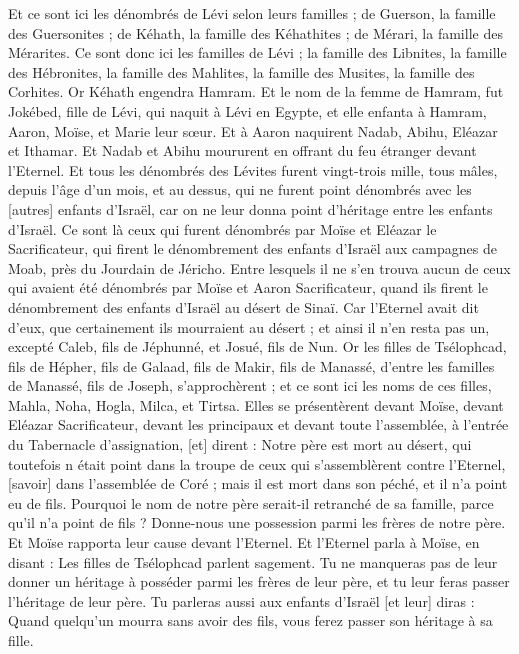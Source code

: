 \begin{multicols}{2}
Et ce sont ici les dénombrés de Lévi selon leurs familles ; de Guerson, la famille des Guersonites ; de Kéhath, la famille des Kéhathites ; de Mérari, la famille des Mérarites.
Ce sont donc ici les familles de Lévi ; la famille des Libnites, la famille des Hébronites, la famille des Mahlites, la famille des Musites, la famille des Corhites. Or Kéhath engendra Hamram.
Et le nom de la femme de Hamram, fut Jokébed, fille de Lévi, qui naquit à Lévi en Egypte, et elle enfanta à Hamram, Aaron, Moïse, et Marie leur sœur.
Et à Aaron naquirent Nadab, Abihu, Eléazar et Ithamar.
Et Nadab et Abihu moururent en offrant du feu étranger devant l'Eternel.
Et tous les dénombrés des Lévites furent vingt-trois mille, tous mâles, depuis l'âge d'un mois, et au dessus, qui ne furent point dénombrés avec les [autres] enfants d'Israël, car on ne leur donna point d'héritage entre les enfants d'Israël.
Ce sont là ceux qui furent dénombrés par Moïse et Eléazar le Sacrificateur, qui firent le dénombrement des enfants d'Israël aux campagnes de Moab, près du Jourdain de Jéricho.
Entre lesquels il ne s'en trouva aucun de ceux qui avaient été dénombrés par Moïse et Aaron Sacrificateur, quand ils firent le dénombrement des enfants d'Israël au désert de Sinaï.
Car l'Eternel avait dit d'eux, que certainement ils mourraient au désert ; et ainsi il n'en resta pas un, excepté Caleb, fils de Jéphunné, et Josué, fils de Nun.
\VerseOne{}Or les filles de Tsélophcad, fils de Hépher, fils de Galaad, fils de Makir, fils de Manassé, d'entre les familles de Manassé, fils de Joseph, s'approchèrent ; et ce sont ici les noms de ces filles, Mahla, Noha, Hogla, Milca, et Tirtsa.
Elles se présentèrent devant Moïse, devant Eléazar Sacrificateur, devant les principaux et devant toute l'assemblée, à l'entrée du Tabernacle d'assignation, [et] dirent :
Notre père est mort au désert, qui toutefois n était point dans la troupe de ceux qui s'assemblèrent contre l'Eternel, [savoir] dans l'assemblée de Coré ; mais il est mort dans son péché, et il n'a point eu de fils.
Pourquoi le nom de notre père serait-il retranché de sa famille, parce qu'il n'a point de fils ? Donne-nous une possession parmi les frères de notre père.
Et Moïse rapporta leur cause devant l'Eternel.
Et l'Eternel parla à Moïse, en disant :
Les filles de Tsélophcad parlent sagement. Tu ne manqueras pas de leur donner un héritage à posséder parmi les frères de leur père, et tu leur feras passer l'héritage de leur père.
Tu parleras aussi aux enfants d'Israël [et leur] diras : Quand quelqu'un mourra sans avoir des fils, vous ferez passer son héritage à sa fille.

\end{multicols}

